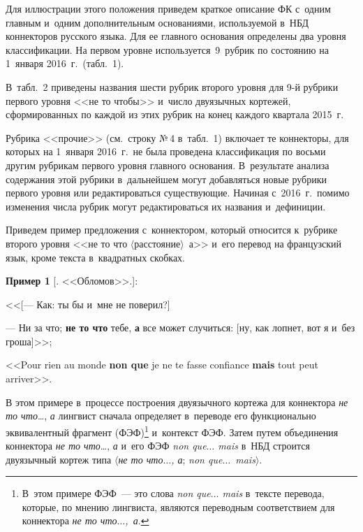 \begin{multicols}{2}
\addtocounter{table}{1}

\vspace*{6pt}
  
  Для иллюстрации этого положения приведем краткое описание ФК 
с~одним главным и~одним дополнительным основаниями, используемой 
в~НБД коннекторов русского языка. Для ее главного основания определены 
два уровня классификации. На первом уровне используется~9~рубрик по 
состоянию на 1~января 2016~г.\ (табл.~1).

 В~табл.~2 приведены 
названия шести руб\-рик второго уровня для 9-й руб\-ри\-ки первого уровня <<не 
то чтобы>> и~число двуязычных кортежей, сформированных по каждой из 
этих руб\-рик на конец каждого квартала 2015~г.




  Рубрика <<прочие>> (см.\ строку №\,4 в~табл.~1) включает те коннекторы, 
для которых на 1~января 2016~г.\ не была проведена классификация по 
восьми другим рубрикам первого уровня главного
 основания. В~результате 
анализа содержания этой рубрики в~дальнейшем могут добавляться новые 
рубрики первого уровня или редактироваться существующие. Начиная 
с~2016~г.\ помимо изменения чис\-ла руб\-рик могут редактироваться их названия 
и~дефиниции.
  

  
  Приведем пример предложения с~коннектором, который относится 
к~рубрике второго уровня <<не то что $\langle$расстояние$\rangle$~а>> и~его перевод 
на французский язык, кроме текста в~квад\-рат\-ных скобках.
  
  \smallskip
  
  \noindent
  \textbf{Пример 1} [. <<Обломов>>.]:
  
  <<[--- Как: ты бы и~мне не поверил?]
  
  --- Ни за что; \textbf{не то что} тебе, \textbf{а} все может случиться: [ну, как лопнет, 
вот я и~без гроша]>>;
  
  <<Pour rien au monde \textbf{non que} je ne te fasse confiance \textbf{mais} tout peut 
arriver>>.
  
  \smallskip
  
  В этом примере в~процессе построения двуязычного кортежа для 
коннектора \textit{не то что}\ldots, \textit{а}\linebreak
 лингвист сначала определяет 
в~переводе его функционально эквивалентный фрагмент 
(ФЭФ)\footnote{В~этом примере ФЭФ~--- это слова \textit{non que$\ldots$ mais} в~тексте 
перевода, которые, по мнению лингвиста, являются переводным соответствием для коннектора 
\textit{не то что$\ldots$,~а}.} и~контекст ФЭФ. Затем путем объединения 
коннектора \textit{не то что}\ldots, \textit{а} и~его ФЭФ \textit{non que$\ldots$ 
mais} в~НБД строится двуязычный кортеж типа $\langle$\textit{не то что$\ldots$, 
а}; \textit{non que$\ldots$\ mais}$\rangle$.
  

\end{multicols}
